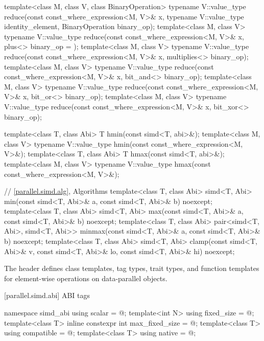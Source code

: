 \begin{codeblock}
{{  template<class M, class V, class BinaryOperation>
    typename V::value_type reduce(const const_where_expression<M, V>& x,
                                  typename V::value_type identity_element,
                                  BinaryOperation binary_op);
  template<class M, class V>
    typename V::value_type reduce(const const_where_expression<M, V>& x,
                                  plus<> binary_op = {});
  template<class M, class V>
    typename V::value_type reduce(const const_where_expression<M, V>& x,
                                  multiplies<> binary_op);
  template<class M, class V>
    typename V::value_type reduce(const const_where_expression<M, V>& x,
                                  bit_and<> binary_op);
  template<class M, class V>
    typename V::value_type reduce(const const_where_expression<M, V>& x,
                                  bit_or<> binary_op);
  template<class M, class V>
    typename V::value_type reduce(const const_where_expression<M, V>& x,
                                  bit_xor<> binary_op);

  template<class T, class Abi>
    T hmin(const simd<T, abi>&);
  template<class M, class V>
    typename V::value_type hmin(const const_where_expression<M, V>&);
  template<class T, class Abi>
    T hmax(const simd<T, abi>&);
  template<class M, class V>
    typename V::value_type hmax(const const_where_expression<M, V>&);

  // \ref{parallel.simd.alg}, Algorithms
  template<class T, class Abi>
    simd<T, Abi>
      min(const simd<T, Abi>& a, const simd<T, Abi>& b) noexcept;
  template<class T, class Abi>
    simd<T, Abi>
      max(const simd<T, Abi>& a, const simd<T, Abi>& b) noexcept;
  template<class T, class Abi>
    pair<simd<T, Abi>, simd<T, Abi>>
      minmax(const simd<T, Abi>& a, const simd<T, Abi>& b) noexcept;
  template<class T, class Abi>
    simd<T, Abi>
      clamp(const simd<T, Abi>& v,
            const simd<T, Abi>& lo,
            const simd<T, Abi>& hi) noexcept;
}
}
\end{codeblock}

\pnum
The header  defines class templates, tag types, trait types, and function templates for element-wise operations on data-parallel objects.

[parallel.simd.abi]{ ABI tags}

\begin{codeblock}
namespace simd_abi {
  using scalar = @\seebelow@;
  template<int N> using fixed_size = @\seebelow@;
  template<class T> inline constexpr int max_fixed_size = @\impdef@;
  template<class T> using compatible = @\impdef@;
  template<class T> using native = @\impdef@;
}
\end{codeblock}


